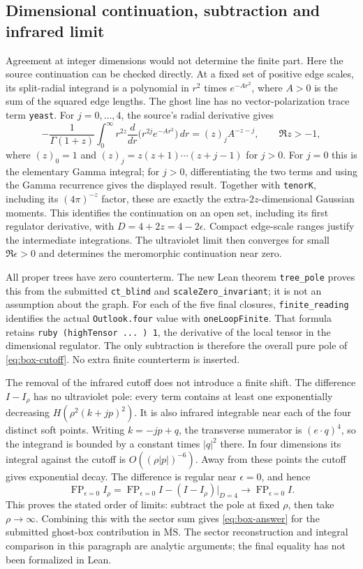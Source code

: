\documentclass[11pt]{article}
\newcommand{\MS}{\overline{\mathrm{MS}}}
\newcommand{\code}[1]{{\small\nolinkurl{#1}}}
\begin{document}
\subsection{Dimensional continuation, subtraction and infrared limit}

Agreement at integer dimensions would not determine the finite part.
Here the source continuation can be checked directly. At a fixed set of
positive edge scales, its split-radial integrand is a polynomial in $r^2$
times $e^{-Ar^2}$, where $A>0$ is the sum of the squared edge lengths.
The ghost line has no vector-polarization trace term \code{yeast}.
For $j=0,\ldots,4$, the source's radial derivative gives
\begin{equation}\label{eq:box-radial}
 -\frac1{\Gamma(1+z)}\int_0^\infty r^{2z}
 \frac{d}{dr}\bigl(r^{2j}e^{-Ar^2}\bigr)\,dr
 =(z)_j A^{-z-j},\qquad \Re z>-1,
\end{equation}
where $(z)_0=1$ and $(z)_j=z(z+1)\cdots(z+j-1)$ for $j>0$.
For $j=0$ this is the elementary Gamma integral; for $j>0$, differentiating
the two terms and using the Gamma recurrence gives the displayed result.
Together with \code{tenorK}, including its $(4\pi)^{-z}$ factor, these are
exactly the extra-$2z$-dimensional Gaussian moments. This identifies the
continuation on an open set, including its first regulator derivative,
with $D=4+2z=4-2\epsilon$. Compact edge-scale ranges justify the intermediate
integrations. The ultraviolet limit then converges for small
$\Re\epsilon>0$ and determines the meromorphic continuation near zero.

All proper trees have zero counterterm. The new Lean theorem
\code{tree_pole} proves this from the submitted \code{ct_blind} and
\code{scaleZero_invariant}; it is not an assumption about the graph.
For each of the five final closures, \code{finite_reading} identifies the
actual \code{Outlook.four} value with \code{oneLoopFinite}. That formula
retains \code{ruby (highTensor ... ) 1}, the derivative of the local tensor
in the dimensional regulator. The only subtraction is therefore the overall
pure pole of \eqref{eq:box-cutoff}. No extra finite counterterm is inserted.

The removal of the infrared cutoff does not introduce a finite shift.
The difference $I-I_\rho$ has no ultraviolet pole: every term contains at
least one exponentially decreasing $H(\rho^2(k+jp)^2)$. It is also infrared
integrable near each of the four distinct soft points. Writing $k=-jp+q$,
the transverse numerator is $(e\cdot q)^4$, so the integrand is bounded
by a constant times $|q|^2$ there. In four dimensions its integral against
the cutoff is $O((\rho|p|)^{-6})$. Away from these points the cutoff gives
exponential decay. The difference is regular near $\epsilon=0$, and hence
\[
 \operatorname{FP}_{\epsilon=0}I_\rho
 =\operatorname{FP}_{\epsilon=0}I-(I-I_\rho)\big|_{D=4}
 \longrightarrow \operatorname{FP}_{\epsilon=0}I.
\]
This proves the stated order of limits: subtract the pole at fixed $\rho$,
then take $\rho\to\infty$. Combining this with the sector sum gives
\eqref{eq:box-answer} for the submitted ghost-box contribution in $\MS$.
The sector reconstruction and integral comparison in this paragraph are
analytic arguments; the final equality has not been formalized in Lean.
\end{document}
